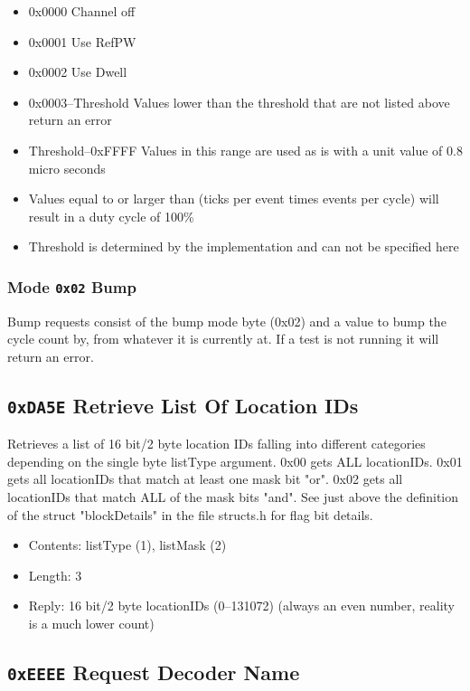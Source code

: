 \documentclass[12pt,a4paper,titlepage]{article}
\begin{document}
\begin{titlepage}
\begin{center}
\begin{itemize}
\item 0x0000 Channel off
\item 0x0001 Use RefPW
\item 0x0002 Use Dwell
\item 0x0003--Threshold Values lower than the threshold that are not listed above return an error
\item Threshold--0xFFFF Values in this range are used as is with a unit value of 0.8 micro seconds
\item Values equal to or larger than (ticks per event times events per cycle) will result in a duty cycle of 100\%
\item Threshold is determined by the implementation and can not be specified here
\end{itemize}

\subsubsection{Mode \texttt{0x02} Bump}

Bump requests consist of the bump mode byte (0x02) and a value to bump the cycle count by, from whatever it is currently at. If a test is not running it will return an error.


\subsection{\texttt{0xDA5E} Retrieve List Of Location IDs}

Retrieves a list of 16 bit/2 byte location IDs falling into different categories depending on the single byte listType argument. 0x00 gets ALL locationIDs. 0x01 gets all locationIDs that match at least one mask bit "or". 0x02 gets all locationIDs that match ALL of the mask bits "and". See just above the definition of the struct "blockDetails" in the file structs.h for flag bit details.

\begin{itemize}
\item Contents: listType (1), listMask (2)
\item Length: 3
\item Reply: 16 bit/2 byte locationIDs (0--131072) (always an even number, reality is a much lower count)
\end{itemize}


\subsection{\texttt{0xEEEE} Request Decoder Name}


\end{center}
\end{titlepage}
\end{document}
